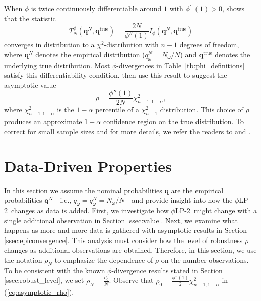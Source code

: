 \documentclass[opre,nonblindrev]{informs3} %
\newcommand{\q}{\mathbf{q}}
\newcommand{\qtrue}{\q^{\text{true}}}
\newcommand{\plp}{$\phi$LP-2}
\begin{document}
When $\phi$ is twice continuously differentiable around $1$ with $\phi^{\prime \prime}(1)>0$, \citet[Theorem 3.1]{pardo2005statistical} shows that the statistic
\[
	T^\phi_N(\q^N,\qtrue) = \frac{2N}{\phi''(1)} I_{\phi}(\q^N, \qtrue)
\]
converges in distribution to a $\chi^2$-distribution with $n-1$ degrees of freedom, where $\q^N$ denotes the empirical distribution ($q^N_\omega = N_\omega/N$) and $\qtrue$ denotes the underlying true distribution.
Most $\phi$-divergences in Table~\ref{tb:phi_definitions} satisfy this differentiability condition.
\citet{bental2013robust} then use this result to suggest the asymptotic value
\begin{equation} \label{eq:asymptotic_rho}
	\rho = \frac{\phi''(1)}{2N} \chi^2_{n-1,1-\alpha},
\end{equation}
where $\chi^2_{n-1,1-\alpha}$ is the $1-\alpha$ percentile of a $\chi^2_{n-1}$ distribution. 
This choice of $\rho$ produces an approximate $1-\alpha$ confidence region on the true distribution.
To correct for small sample sizes and for more details, we refer the readers to \cite{pardo2005statistical} and \cite{bental2013robust}. 


\section{Data-Driven Properties}
\label{sec:properties}

In this section we assume the nominal probabilities $\q$ are the empirical probabilities $\q^{N}$---i.e., $q_\omega=q_\omega^N = {N_\omega}/{N}$---and provide insight into how the \plp\ changes as data is added.
First, we investigate how \plp\ might change with a single additional observation in Section \ref{ssec:value}. 
Next, we examine what happens as more and more data is gathered with asymptotic results in Section \ref{ssec:epiconvergence}.
This analysis must consider how the level of robustness $\rho$ changes as additional observations are obtained. 
Therefore, in this section, we use the notation $\rho_N$ to emphasize the dependence of $\rho$ on the number observations.
To be consistent with the known $\phi$-divergence results stated in Section \ref{ssec:robust_level}, we set $\rho_N = \frac{\rho_0}{N}$.
Observe that $\rho_0=\frac{\phi''(1)}{2} \chi^2_{n-1,1-\alpha}$ in (\ref{eq:asymptotic_rho}). 
\end{document}

